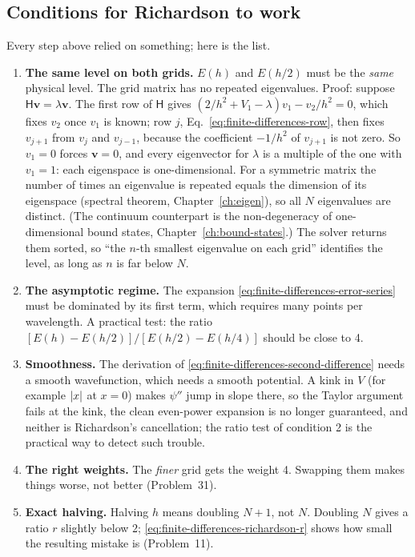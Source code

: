 \subsection{Conditions for Richardson to work}

Every step above relied on something; here is the list.
\begin{enumerate}
\item \textbf{The same level on both grids.} $E(h)$ and $E(h/2)$ must be the \emph{same} physical level. The grid matrix has no repeated eigenvalues. Proof: suppose $\mathsf H\mathbf v=\lambda\mathbf v$. The first row of $\mathsf H$ gives $(2/h^2+V_1-\lambda)v_1-v_2/h^2=0$, which fixes $v_2$ once $v_1$ is known; row $j$, Eq.~\eqref{eq:finite-differences-row}, then fixes $v_{j+1}$ from $v_j$ and $v_{j-1}$, because the coefficient $-1/h^2$ of $v_{j+1}$ is not zero. So $v_1=0$ forces $\mathbf v=0$, and every eigenvector for $\lambda$ is a multiple of the one with $v_1=1$: each eigenspace is one-dimensional. For a symmetric matrix the number of times an eigenvalue is repeated equals the dimension of its eigenspace (spectral theorem, Chapter~\ref{ch:eigen}), so all $N$ eigenvalues are distinct. (The continuum counterpart is the non-degeneracy of one-dimensional bound states, Chapter~\ref{ch:bound-states}.) The solver returns them sorted, so ``the $n$-th smallest eigenvalue on each grid'' identifies the level, as long as $n$ is far below $N$.
\item \textbf{The asymptotic regime.} The expansion \eqref{eq:finite-differences-error-series} must be dominated by its first term, which requires many points per wavelength. A practical test: the ratio $[E(h)-E(h/2)]/[E(h/2)-E(h/4)]$ should be close to 4.
\item \textbf{Smoothness.} The derivation of \eqref{eq:finite-differences-second-difference} needs a smooth wavefunction, which needs a smooth potential. A kink in $V$ (for example $\left\lvert x\right\rvert$ at $x=0$) makes $\psi''$ jump in slope there, so the Taylor argument fails at the kink, the clean even-power expansion is no longer guaranteed, and neither is Richardson's cancellation; the ratio test of condition 2 is the practical way to detect such trouble.
\item \textbf{The right weights.} The \emph{finer} grid gets the weight 4. Swapping them makes things worse, not better (Problem~31).
\item \textbf{Exact halving.} Halving $h$ means doubling $N+1$, not $N$. Doubling $N$ gives a ratio $r$ slightly below 2; \eqref{eq:finite-differences-richardson-r} shows how small the resulting mistake is (Problem~11).
\end{enumerate}

